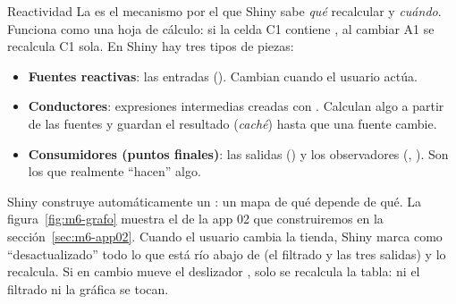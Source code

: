 \begin{concepto}{Reactividad}
La  es el mecanismo por el que Shiny sabe \emph{qué}
recalcular y \emph{cuándo}. Funciona como una hoja de cálculo: si la celda
C1 contiene , al cambiar A1 se recalcula C1 sola. En Shiny
hay tres tipos de piezas:
\begin{itemize}
  \item \textbf{Fuentes reactivas}: las entradas (). Cambian
        cuando el usuario actúa.
  \item \textbf{Conductores}: expresiones intermedias creadas con
        . Calculan algo a partir de las fuentes y guardan
        el resultado (\emph{caché}) hasta que una fuente cambie.
  \item \textbf{Consumidores (puntos finales)}: las salidas
        () y los observadores (,
        ). Son los que realmente ``hacen'' algo.
\end{itemize}
\end{concepto}

Shiny construye automáticamente un : un mapa de qué
depende de qué. La figura~\ref{fig:m6-grafo} muestra el de la app 02 que
construiremos en la sección~\ref{sec:m6-app02}. Cuando el usuario cambia la
tienda, Shiny marca como ``desactualizado'' todo lo que está río abajo de
 (el filtrado y las tres salidas) y lo recalcula. Si
en cambio mueve el deslizador , solo se recalcula la tabla:
ni el filtrado ni la gráfica se tocan.


